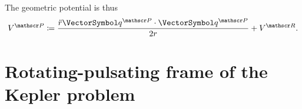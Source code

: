 \documentclass[10pt, a4paper, twoside]{basestyle}
\begin{document}
The geometric potential is thus
\[V^{\mathscr P}\DefineAs\frac{\SecondTimeDerivative{r}\scal{\vq^{\mathscr P}}{\vq^{\mathscr P}}}{2r} + {V^{\mathscr R}}\text.\]
\section{Rotating-pulsating frame of the Kepler problem}
\end{document}
